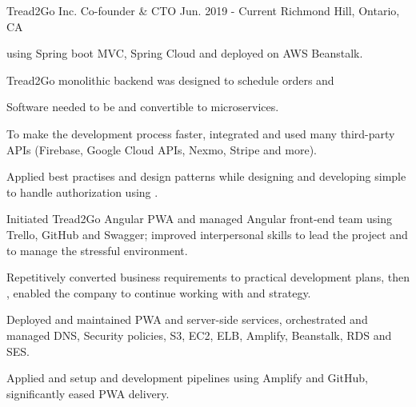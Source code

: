 \begin{cventries}
  \cventry
    {Tread2Go Inc.} %
    {Co-founder \& CTO} %
    {Jun. 2019 - Current} %
    {Richmond Hill, Ontario, CA} %
    {
      \begin{cvitems} %
        \item { using Spring boot MVC, Spring Cloud and deployed on AWS Beanstalk.}
          \begin{cvsubitems}
            \item {Tread2Go monolithic backend was designed to schedule orders and }
            \item {Software needed to be  and convertible to microservices.}
            \item {To make the development process faster, integrated and used many third-party APIs (Firebase, Google Cloud APIs, Nexmo, Stripe and more).}
            \item {Applied best practises and design patterns while designing and developing simple  to handle authorization using .}
          \end{cvsubitems}
        \item {Initiated Tread2Go Angular PWA and managed Angular front-end team using Trello, GitHub and Swagger; improved interpersonal skills to lead the project and  to manage the stressful environment.}
          \begin{cvsubitems}
            \item {Repetitively converted business requirements to practical development plans, then , enabled the company to continue working with  and  strategy.}
          \end{cvsubitems}
        \item {Deployed and maintained PWA and server-side services, orchestrated and managed DNS, Security policies, S3, EC2, ELB, Amplify, Beanstalk, RDS and SES.}
          \begin{cvsubitems}
            \item {Applied and setup  and development pipelines using Amplify and GitHub, significantly eased PWA delivery.}
          \end{cvsubitems}
      \end{cvitems}
    }


\end{cventries}
